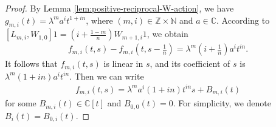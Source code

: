 \documentclass[a4paper]{amsart}
\numberwithin{equation}{section}
\begin{document}
\begin{proof}
By Lemma \ref{lem:positive-reciprocal-W-action}, we have 
$
g_{m,i}(t)=\lambda^m a^i t^{1+in}$,
 where   $(m,i)\in\mathbb Z\times\mathbb N$  and $a\in\mathbb{C}.
$
According to 
$
[L_{m,i},W_{1,0}]1=(i+\frac{1-m}{n})W_{m+1,i}1
$, we obtain
\begin{align*}
f_{m,i}(t,s)-f_{m,i}\left(t,s-\frac 1n\right)
=
\lambda^m\left(i+\frac1n\right)a^i t^{in}.
\end{align*}
It follows that $f_{m,i}(t,s)$ is linear in $s$, and its coefficient of
$s$ is
$ 
\lambda^{m}(1+in)a^i t^{in}.
$
Then we can write 
\begin{align}\label{eq3.242}
f_{m,i}(t,s)=\lambda^ma^i (1+in)t^{in}s+B_{m,i}(t)
\end{align} 
for some $B_{m,i}(t)\in\mathbb C[t]$ and $B_{0,0}(t)=0$. For simplicity, we denote  
$B_{i}(t)=B_{0,i}(t)$.


\end{proof}
\end{document}
